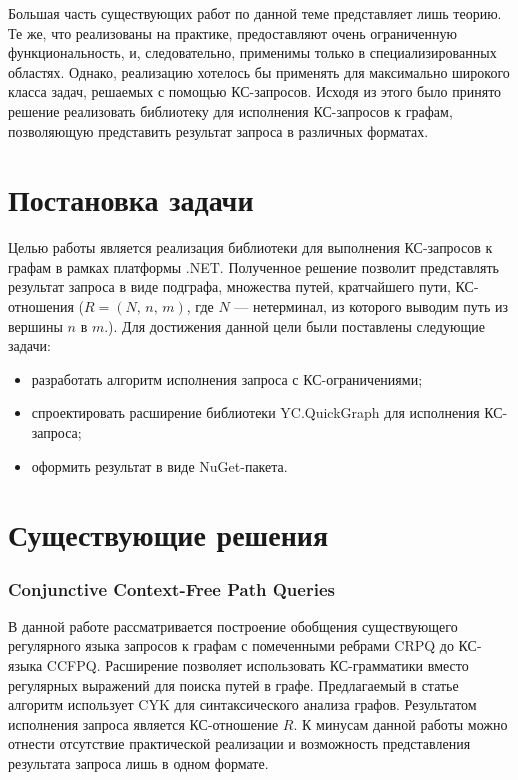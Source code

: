 \documentclass{spisok-article}
\begin{document}
    Большая часть существующих работ по данной теме представляет лишь теорию. Те же, что реализованы на практике, предоставляют очень ограниченную функциональность, и, следовательно, применимы только в специализированных областях. Однако, реализацию хотелось бы применять для максимально широкого класса задач, решаемых с помощью КС-запросов. Исходя из этого было принято решение реализовать библиотеку для исполнения КС-запросов к графам, позволяющую представить результат запроса в различных форматах.

\section{Постановка задачи}
    Целью работы является реализация библиотеки для выполнения КС-запросов к графам в рамках платформы .NET. Полученное решение позволит представлять результат запроса в виде подграфа, множества путей, кратчайшего пути, КС-отношения (\(R = (N,\, n,\, m)\), где \(N\) --- нетерминал, из которого выводим путь из вершины \(n\) в \(m\).).
    Для достижения данной цели были поставлены следующие задачи:
    \begin{itemize}
	    \item разработать алгоритм исполнения запроса с КС-ограничениями;
        \item спроектировать расширение библиотеки YC.QuickGraph для исполнения КС-запроса;
        \item оформить результат в виде NuGet-пакета.
	\end{itemize}
\section{Существующие решения}
        \subsubsection*{Conjunctive Context-Free Path Queries}
		    В данной работе \cite{hellings} рассматривается построение обобщения существующего регулярного языка запросов к графам с помеченными ребрами CRPQ до КС-языка CCFPQ. Расширение позволяет использовать КС-грамматики вместо регулярных выражений для поиска путей в графе. Предлагаемый в статье алгоритм использует CYK для синтаксического анализа графов. Результатом исполнения запроса является КС-отношение \(R\). К минусам данной работы можно отнести отсутствие практической реализации и возможность представления результата запроса лишь в одном формате.
\end{document}
